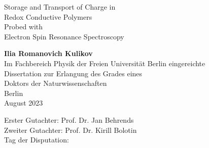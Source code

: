 \documentclass{book}
\begin{document}
\thispagestyle{empty}
\begin{center}
\begin{huge}
Storage and Transport of Charge in\\
Redox Conductive Polymers\\
Probed with\\
Electron Spin Resonance Spectroscopy\\
\end{huge}
\vspace{10\baselineskip}
\textbf{Ilia Romanovich Kulikov}\\
\vspace{10\baselineskip}
Im Fachbereich Physik der Freien Universit\"{a}t Berlin eingereichte\\
Dissertation zur Erlangung des Grades eines\\
Doktors der Naturwissenschaften\\
\vspace{16\baselineskip}
Berlin\\
August 2023\\




\end{center}
\newpage
\vspace{36\baselineskip}

\hspace*{\fill} Erster Gutachter: Prof. Dr. Jan Behrends\\
\hspace*{\fill} Zweiter Gutachter: Prof. Dr. Kirill Bolotin\\
\hspace*{\fill} Tag der Disputation: \\

\newpage
\tableofcontents
\newpage

%













\end{document}
